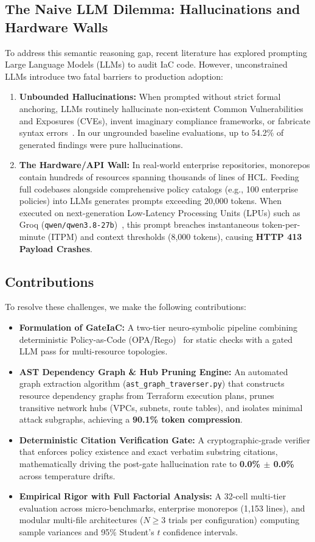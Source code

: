 \documentclass[conference]{IEEEtran}
\begin{document}
\subsection{The Naive LLM Dilemma: Hallucinations and Hardware Walls}
To address this semantic reasoning gap, recent literature has explored prompting Large Language Models (LLMs) to audit IaC code. However, unconstrained LLMs introduce two fatal barriers to production adoption:
\begin{enumerate}
    \item \textbf{Unbounded Hallucinations:} When prompted without strict formal anchoring, LLMs routinely hallucinate non-existent Common Vulnerabilities and Exposures (CVEs), invent imaginary compliance frameworks, or fabricate syntax errors~\cite{pearce2022asleep, sandoval2023lost}. In our ungrounded baseline evaluations, up to 54.2\% of generated findings were pure hallucinations.
    \item \textbf{The Hardware/API Wall:} In real-world enterprise repositories, monorepos contain hundreds of resources spanning thousands of lines of HCL. Feeding full codebases alongside comprehensive policy catalogs (e.g., 100 enterprise policies) into LLMs generates prompts exceeding 20,000 tokens. When executed on next-generation Low-Latency Processing Units (LPUs) such as Groq (\texttt{qwen/qwen3.8-27b})~\cite{groq_lpu}, this prompt breaches instantaneous token-per-minute (ITPM) and context thresholds (8,000 tokens), causing \textbf{HTTP 413 Payload Crashes}.
\end{enumerate}

\subsection{Contributions}
To resolve these challenges, we make the following contributions:
\begin{itemize}
    \item \textbf{Formulation of GateIaC:} A two-tier neuro-symbolic pipeline combining deterministic Policy-as-Code (OPA/Rego)~\cite{opa_rego} for static checks with a gated LLM pass for multi-resource topologies.
    \item \textbf{AST Dependency Graph \& Hub Pruning Engine:} An automated graph extraction algorithm (\texttt{ast\_graph\_traverser.py}) that constructs resource dependency graphs from Terraform execution plans, prunes transitive network hubs (VPCs, subnets, route tables), and isolates minimal attack subgraphs, achieving a \textbf{90.1\% token compression}.
    \item \textbf{Deterministic Citation Verification Gate:} A cryptographic-grade verifier that enforces policy existence and exact verbatim substring citations, mathematically driving the post-gate hallucination rate to \textbf{0.0\% $\pm$ 0.0\%} across temperature drifts.
    \item \textbf{Empirical Rigor with Full Factorial Analysis:} A 32-cell multi-tier evaluation across micro-benchmarks, enterprise monorepos (1,153 lines), and modular multi-file architectures ($N \ge 3$ trials per configuration) computing sample variances and 95\% Student's $t$ confidence intervals.
\end{itemize}
\end{document}
